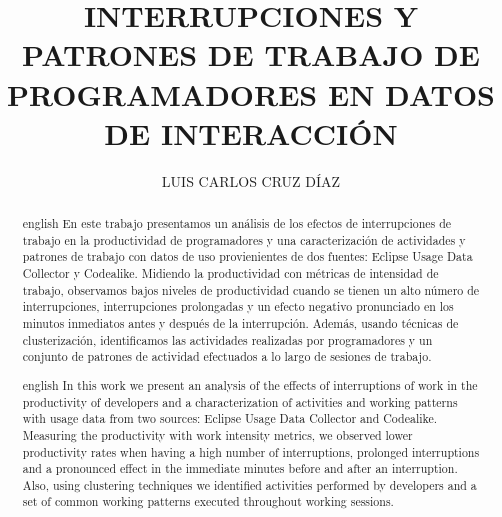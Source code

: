 \documentclass{tesisITAM}
\title{INTERRUPCIONES Y PATRONES DE TRABAJO DE PROGRAMADORES EN DATOS DE INTERACCIÓN}
\author{LUIS CARLOS CRUZ DÍAZ}
\begin{document}
	
	\maketitle
	\publicationrights
	
	\large

	
	\begin{abstract}{english}
		En este trabajo presentamos un análisis de los efectos de interrupciones de trabajo en la productividad de programadores y una caracterización de actividades y patrones de trabajo con datos de uso provienientes de dos fuentes: Eclipse Usage Data Collector y Codealike. Midiendo la productividad con métricas de intensidad de trabajo, observamos bajos niveles de productividad cuando se tienen un alto número de interrupciones, interrupciones prolongadas y un efecto negativo pronunciado en los minutos inmediatos antes y después de la interrupción. Además, usando técnicas de clusterización, identificamos las actividades realizadas por programadores y un conjunto de patrones de actividad efectuados a lo largo de sesiones de trabajo.
	\end{abstract}

	\begin{abstract}{english}
		In this work we present an analysis of the effects of interruptions of work in the productivity of developers and a characterization of activities and working patterns with usage data from two sources: Eclipse Usage Data Collector and Codealike. Measuring the productivity with work intensity metrics, we observed lower productivity rates when having a high number of interruptions, prolonged interruptions and a pronounced effect in the immediate minutes before and after an interruption. Also, using clustering techniques we identified activities performed by developers and a set of common working patterns executed throughout working sessions.
	\end{abstract}


	\setcounter{page}{1}
	\tableofcontents
	\listoffigures
	\listoftables
	\newpage

	\setcounter{page}{1}


	 
\end{document}
